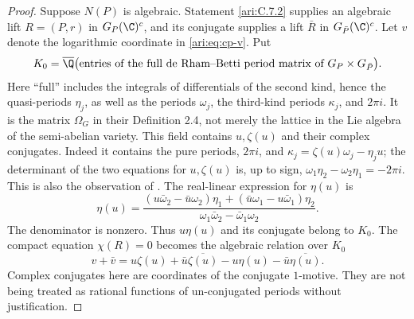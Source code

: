 \begin{proof}
Suppose $N(P)$ is algebraic. Statement \ref{ari:C.7.2} supplies an
algebraic lift $R=(P,r)$ in $G_P(\C)^c$, and its conjugate
supplies a lift $\bar R$ in $G_{\bar P}(\C)^c$.
Let $v$ denote the logarithmic coordinate in
\eqref{ari:eq:cp-v}. Put
\[
 K_0=\overline\Q\bigl(\text{entries of the full de Rham--Betti
                    period matrix of }G_P\times G_{\bar P}\bigr).
\]
Here ``full'' includes the integrals of differentials of the second
kind, hence the quasi-periods $\eta_j$, as well as the periods
$\omega_j$, the third-kind periods $\kappa_j$, and $2\pi i$.
It is the matrix $\Omega_G$ in their Definition 2.4, not merely
the lattice in the Lie algebra of the semi-abelian variety.
This field contains $u,\zeta(u)$ and their complex conjugates.
Indeed it contains the pure periods, $2\pi i$, and
$\kappa_j=\zeta(u)\omega_j-\eta_j u$; the determinant of
the two equations for $u,\zeta(u)$ is, up to sign,
$\omega_1\eta_2-\omega_2\eta_1= -2\pi i$.
This is also the observation of \citet[Remark 4.13]{bertolin2022}.
The real-linear expression for $\eta(u)$ is
\begin{equation}\label{ari:eq:cp-real-linear}
 \eta(u)=
 \frac{(u\bar\omega_2-\bar u\omega_2)\eta_1
       +(\bar u\omega_1-u\bar\omega_1)\eta_2}
      {\omega_1\bar\omega_2-\bar\omega_1\omega_2}.
\end{equation}
The denominator is nonzero. Thus $u\eta(u)$ and its conjugate
belong to $K_0$. The compact equation $\chi(R)=0$ becomes
the algebraic relation over $K_0$
\begin{equation}\label{ari:eq:cp-relation}
 v+\bar v
 =u\zeta(u)+\bar u\overline{\zeta(u)}
                -u\eta(u)-\bar u\overline{\eta(u)}.
\end{equation}
Complex conjugates here are coordinates of the conjugate
$1$-motive. They are not being treated as rational functions
of un-conjugated periods without justification.


\end{proof}
